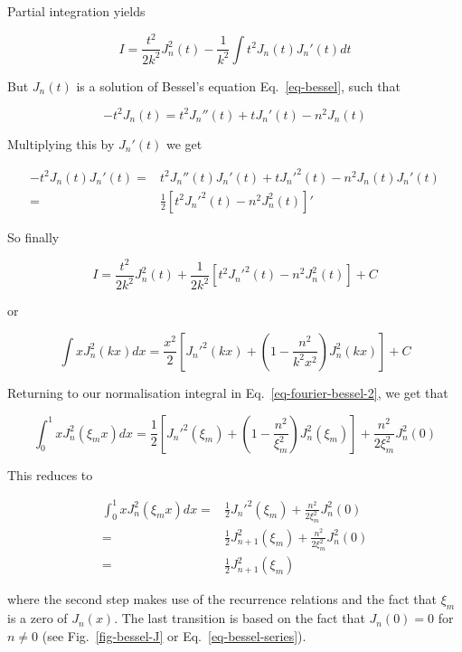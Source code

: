 Partial integration yields

\begin{equation}
I = \frac{t^2}{2 k^2}J_n^2(t) - \frac{1}{k^2} \int t^2 J_n(t) J_n'(t) dt
\end{equation} 

But $J_n(t)$ is a solution of Bessel's equation Eq.~\ref{eq-bessel}, such that

\begin{equation} 
- t^2 J_n(t) = t^2 J_n''(t) + t J_n'(t) - n^2 J_n(t)
\end{equation}

Multiplying this by $J_n'(t)$ we get

\begin{align} 
- t^2 J_n(t) J_n'(t) = & t^2 J_n''(t)J_n'(t) + t J_n'^2(t) - n^2 J_n(t)J_n'(t) \nonumber \\
 = & \frac{1}{2} \left[{t^2 J_n'^2(t) - n^2 J_n^2(t)}\right]'
\end{align}

So finally

\begin{equation}
I = \frac{t^2}{2 k^2}J_n^2(t) + \frac{1}{2 k^2} \left[{t^2 J_n'^2(t) - n^2 J_n^2(t)}\right] + C
\end{equation} 

or

\begin{equation}
\int x J_n^2(k x) dx = \frac{x^2}{2}\left[{J_n'^2(kx) + \left(1 - \frac{n^2}{k^2x^2}\right) J_n^2(kx)}\right] + C
\end{equation} 

Returning to our normalisation integral in Eq.~\ref{eq-fourier-bessel-2}, we get that

\begin{equation}
\int_0^1 x J_n^2(\xi_m x) dx = \frac{1}{2}\left[{J_n'^2(\xi_m) + \left(1 - \frac{n^2}{\xi_m^2}\right) J_n^2(\xi_m)}\right] + \frac{n^2}{2\xi_m^2} J_n^2(0)
\end{equation} 

This reduces to

\begin{align}
\int_0^1 x J_n^2(\xi_m x) dx =& \frac{1}{2}J_n'^2(\xi_m) + \frac{n^2}{2\xi_m^2} J_n^2(0) \nonumber \\
 =& \frac{1}{2}J_{n+1}^2(\xi_m) + \frac{n^2}{2\xi_m^2} J_n^2(0) \nonumber \\
 =& \frac{1}{2}J_{n+1}^2(\xi_m)
\end{align} 

where the second step makes use of the recurrence relations and the fact that $\xi_m$ is a zero of $J_n(x)$. The last transition is based on the fact that $J_n(0)=0$ for $n \ne 0$ (see Fig.~\ref{fig-bessel-J} or Eq.~\ref{eq-bessel-series}).

